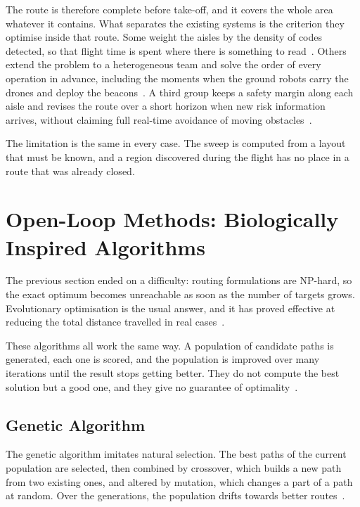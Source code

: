 The route is therefore complete before take-off, and it covers the whole area
whatever it contains. What separates the existing systems is the criterion they
optimise inside that route. Some weight the aisles by the density of codes
detected, so that flight time is spent where there is something to
read~\cite{kalinov2020warevision}. Others extend the problem to a heterogeneous
team and solve the order of every operation in advance, including the moments
when the ground robots carry the drones and deploy the
beacons~\cite{guinand2021uavugv}. A third group keeps a safety margin along each
aisle and revises the route over a short horizon when new risk information
arrives, without claiming full real-time avoidance of moving
obstacles~\cite{pore2026uavqr}.

The limitation is the same in every case. The sweep is computed from a layout
that must be known, and a region discovered during the flight has no place in a
route that was already closed.

\section{Open-Loop Methods: Biologically Inspired Algorithms}%
\label{sec:nav:metaheuristics}

The previous section ended on a difficulty: routing formulations are NP-hard, so
the exact optimum becomes unreachable as soon as the number of targets grows.
Evolutionary optimisation is the usual answer, and it has proved effective at
reducing the total distance travelled in real cases~\cite{krayani2023goal}.

These algorithms all work the same way. A population of candidate paths is
generated, each one is scored, and the population is improved over many
iterations until the result stops getting better. They do not compute the best
solution but a good one, and they give no guarantee of
optimality~\cite{kumar2025comprehensive}.

\subsection{Genetic Algorithm}%
\label{subsec:nav:ga}

The genetic algorithm imitates natural selection. The best paths of the current
population are selected, then combined by crossover, which builds a new path from
two existing ones, and altered by mutation, which changes a part of a path at
random. Over the generations, the population drifts towards better
routes~\cite{kumar2025comprehensive}.

